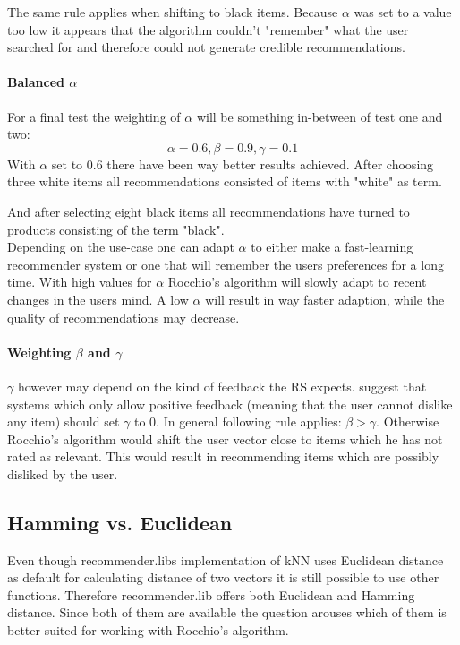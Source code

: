 The same rule applies when shifting to black items.
Because $\alpha$ was set to a value too low it appears that the algorithm couldn't "remember" what the user searched for and therefore could not generate credible recommendations.
\\

\paragraph{Balanced $\alpha$}
For a final test the weighting of $\alpha$ will be something in-between of test one and two:
$$\alpha = 0.6, \beta = 0.9, \gamma = 0.1$$
With $\alpha$ set to 0.6 there have been way better results achieved.
After choosing three white items all recommendations consisted of items with "white" as term.

And after selecting eight black items all recommendations have turned to products consisting of the term "black".
\\

Depending on the use-case one can adapt $\alpha$ to either make a fast-learning recommender system or one that will remember the users preferences for a long time.
With high values for $\alpha$ Rocchio's algorithm will slowly adapt to recent changes in the users mind.
A low $\alpha$ will result in way faster adaption, while the quality of recommendations may decrease.

\paragraph{Weighting $\beta$ and $\gamma$}
$\gamma$ however may depend on the kind of feedback the RS expects.
\citeauthor{manning:2009} suggest that systems which only allow positive feedback (meaning that the user cannot dislike any item) should set $\gamma$ to 0.\citep[p.~183]{manning:2009}
In general following rule applies: $\beta > \gamma$.
Otherwise Rocchio's algorithm would shift the user vector close to items which he has not rated as relevant.
This would result in recommending items which are possibly disliked by the user.


\subsection{Hamming vs. Euclidean}
\label{sec:hamming-vs-euclidean}
Even though recommender.libs implementation of kNN uses Euclidean distance as default for calculating distance of two vectors it is still possible to use other functions.
Therefore recommender.lib offers both Euclidean and Hamming distance.
Since both of them are available the question arouses which of them is better suited for working with Rocchio's algorithm.

